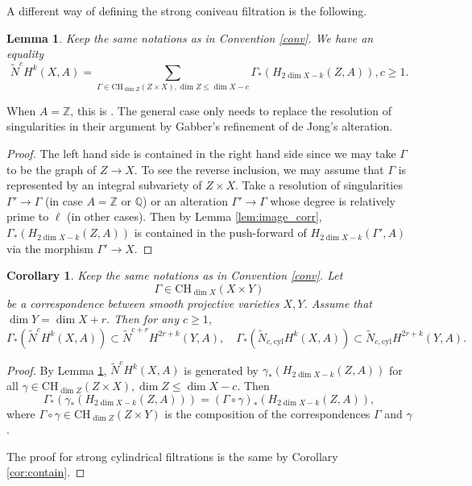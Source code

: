 \documentclass{amsart}
\newtheorem{cor}[theorem]{Corollary}
\newtheorem{lem}[theorem]{Lemma}
\theoremstyle{definition}
\theoremstyle{remark}
\newcommand{\mbb}{\mathbb}
\newcommand{\QQ}{\mbb{Q}}
\newcommand{\ZZ}{\mbb{Z}}
\newcommand{\cyl}{\text{cyl}}
\begin{document}
A different way of defining the strong coniveau filtration is the following.
\begin{lem}\label{lem:str_coniveau}
    Keep the same notations as in Convention \ref{conv}. We have an equality
    \[
    \tilde{N}^cH^{k}(X, A)=\sum_{\Gamma \in \text{CH}_{\dim Z}(Z \times X), \dim Z \leq \dim X-c}\Gamma_*(H_{2\dim X-k}(Z, A)), c\geq 1.
    \]
\end{lem}
When $A=\ZZ$, this is \cite[Equation 2.1]{BO_Coniveau}. The general case only needs to replace the resolution of singularities in their argument by Gabber's refinement of de Jong's alteration.
\begin{proof}
    The left hand side is contained in the right hand side since we may take $\Gamma$ to be the graph of $Z \to X$.
To see the reverse inclusion, we may assume that $\Gamma$ is represented by an integral subvariety of $Z\times X$. Take a resolution of singularities $\Gamma' \to \Gamma$ (in case $A=\ZZ$ or $\QQ$) or an alteration $\Gamma' \to \Gamma$ whose degree is relatively prime to $\ell$ (in other cases). 
Then by Lemma \ref{lem:image_corr}, $\Gamma_*(H_{2\dim X-k}(Z, A))$ is contained in the push-forward of $H_{2\dim X-k}(\Gamma', A)$ via the morphism $\Gamma' \to X$.
\end{proof}

\begin{cor}\label{cor:str_co}
     Keep the same notations as in Convention \ref{conv}.
     Let $$\Gamma \in \text{CH}_{\dim X}(X \times Y)$$ be a correspondence between smooth projective varieties $X, Y$. Assume that $\dim Y=\dim X+r$. Then for any $c\geq 1$,
     \[
     \Gamma_*(\tilde{N}^cH^k(X, A))\subset \tilde{N}^{c+r}H^{2r+k}(Y, A),\quad \Gamma_*(\tilde{N}_{c, \cyl}H^k(X, A))\subset \tilde{N}_{c, \cyl}H^{2r+k}(Y, A).
     \]
\end{cor}
\begin{proof}
    
    By Lemma \ref{lem:str_coniveau}, $\tilde{N}^cH^{k}(X, A)$ is generated by $\gamma_*(H_{2\dim X-k}(Z, A))$ for all $\gamma \in \text{CH}_{\dim Z}(Z \times X), \dim Z \leq \dim X-c$.
    Then \[
    \Gamma_*(\gamma_*(H_{2\dim X-k}(Z, A)))=(\Gamma \circ \gamma)_*(H_{2\dim X-k}(Z, A)),\]
    where $\Gamma\circ\gamma \in \text{CH}_{\dim Z}(Z \times Y)$ is the composition of the correspondences $\Gamma$ and $\gamma$.

    The proof for strong cylindrical filtrations is the same by Corollary \ref{cor:contain}.
\end{proof}
\end{document}
